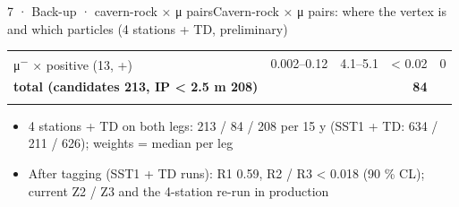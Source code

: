 \begin{btframe}{7 · Back-up · cavern-rock × μ pairs}{Cavern-rock × μ pairs: where the vertex is and which particles (4 stations + TD, preliminary)}
\begin{minipage}[t]{\dimexpr(0.50\linewidth-0.50\dimexpr9.67pt\relax)}
{\begin{tabularx}{\linewidth}{>{\raggedright\arraybackslash}Xrrrr}
μ\textsuperscript{−} × positive (13, +) & 0.002–0.12 & 4.1–5.1 & < 0.02 & 0 \\\rowrule
\rowcolor{tint}\bfseries total (candidates 213, IP < 2.5 m 208) & & & \bfseries 84 & \\\rowrule
\end{tabularx}\par}
\vspace{2pt}
\begin{itemize}
  \item 4 stations + TD on both legs: 213 / 84 / 208 per 15 y (SST1 + TD: 634 / 211 / 626); weights = median per leg
  \item After tagging (SST1 + TD runs): R1 0.59, R2 / R3 < 0.018 (90 \% CL); current Z2 / Z3 and the 4-station re-run in production
\end{itemize}
\end{minipage}\par
\end{btframe}
